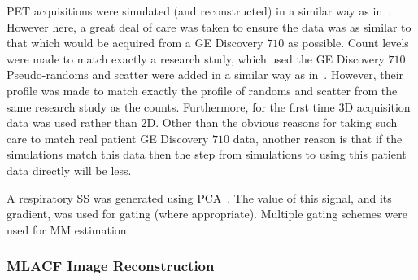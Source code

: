                 \gls{PET} acquisitions were simulated (and reconstructed) in a similar way as in~. However here, a great deal of care was taken to ensure the data was as similar to that which would be acquired from a \gls{GE} Discovery $710$ as possible. Count levels were made to match exactly a research study, which used the \gls{GE} Discovery $710$. Pseudo-randoms and scatter were added in a similar way as in~. However, their profile was made to match exactly the profile of randoms and scatter from the same research study as the counts. Furthermore, for the first time \gls{3D} acquisition data was used rather than \gls{2D}. Other than the obvious reasons for taking such care to match real patient \gls{GE} Discovery $710$ data, another reason is that if the simulations match this data then the step from simulations to using this patient data directly will be less.
                
                A respiratory \gls{SS} was generated using \gls{PCA}~\parencite{Thielemans2011}. The value of this signal, and its gradient, was used for gating (where appropriate). Multiple gating schemes were used for \gls{MM} estimation. %
                
            \subsubsection{MLACF Image Reconstruction} \label{sec:evaluation_of_pet_ct_motion_correction_incorporating_motion_models_using_mlacf_and_complex_gating_schemes_methods_mlacf_image_reconstruction}
            
